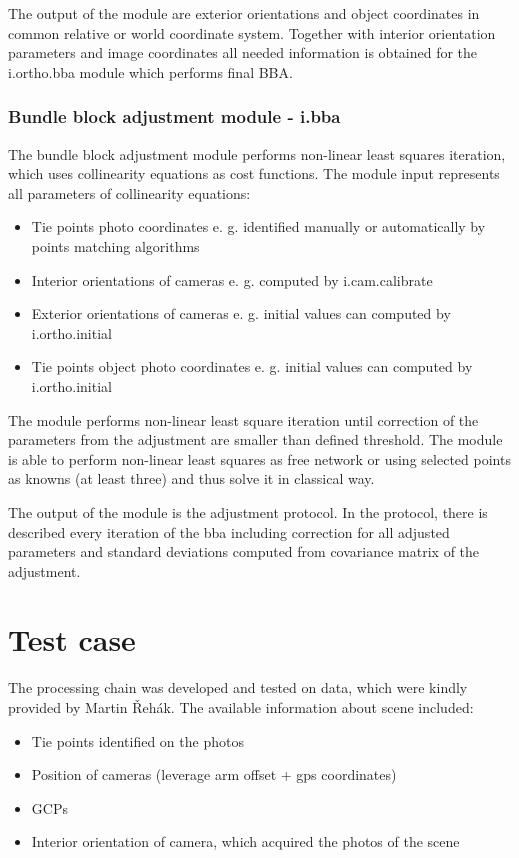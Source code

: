 \documentclass[a4paper,12pt]{article}
\begin{document}
The output of the module are exterior orientations and object coordinates in common relative or world coordinate system. Together with interior
orientation parameters and image coordinates all needed information is obtained for the i.ortho.bba module which performs final BBA.  

\subsubsection{Bundle block adjustment module - i.bba}

The bundle block adjustment module performs non-linear least squares iteration, which 
uses collinearity equations as cost functions. 
The module input represents all parameters of collinearity equations:
\begin{itemize}
\item Tie points photo coordinates e. g. identified manually or automatically by points matching algorithms
\item Interior orientations of cameras e. g. computed by i.cam.calibrate
\item Exterior orientations of cameras e. g. initial values can computed by i.ortho.initial
\item Tie points object photo coordinates e. g. initial values can computed by i.ortho.initial
\end{itemize}

The module performs non-linear least square iteration until correction of the parameters from the adjustment are smaller than
defined threshold. The module is able to perform non-linear least squares as free network or using selected points 
as knowns (at least three) and thus solve it in classical way. 

The output of the module is the adjustment protocol. In the protocol, there
is described every iteration of the bba including correction for all adjusted parameters and standard deviations computed from 
covariance matrix of the adjustment. 

\section{Test case}

The processing chain was developed and tested on data, which were kindly provided by Martin Řehák. The available 
information about scene included:

\begin{itemize}
\item Tie points identified on the photos
\item Position of cameras (leverage arm offset + gps coordinates)
\item GCPs
\item Interior orientation of camera, which acquired the photos of the scene
\end{itemize}
\end{document}
